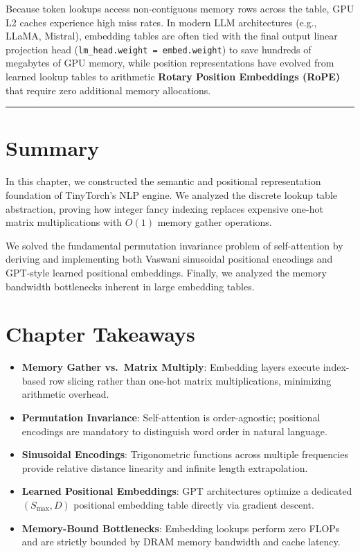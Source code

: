 \documentclass[
  letterpaper,
]{scrbook}
\providecommand{\tightlist}{%
  \setlength{\itemsep}{0pt}\setlength{\parskip}{0pt}}
\begin{document}
Because token lookups access non-contiguous memory rows across the
table, GPU L2 caches experience high miss rates. In modern LLM
architectures (e.g., LLaMA, Mistral), embedding tables are often tied
with the final output linear projection head
(\texttt{lm\_head.weight\ =\ embed.weight}) to save hundreds of
megabytes of GPU memory, while position representations have evolved
from learned lookup tables to arithmetic \textbf{Rotary Position
Embeddings (RoPE)} that require zero additional memory allocations.

\begin{center}\rule{0.5\linewidth}{0.5pt}\end{center}

\section{Summary}\label{summary-11}

In this chapter, we constructed the semantic and positional
representation foundation of TinyTorch's NLP engine. We analyzed the
discrete lookup table abstraction, proving how integer fancy indexing
replaces expensive one-hot matrix multiplications with \(O(1)\) memory
gather operations.

We solved the fundamental permutation invariance problem of
self-attention by deriving and implementing both Vaswani sinusoidal
positional encodings and GPT-style learned positional embeddings.
Finally, we analyzed the memory bandwidth bottlenecks inherent in large
embedding tables.

\section{Chapter Takeaways}\label{chapter-takeaways-11}

\begin{itemize}
\tightlist
\item
  \textbf{Memory Gather vs.~Matrix Multiply}: Embedding layers execute
  index-based row slicing rather than one-hot matrix multiplications,
  minimizing arithmetic overhead.
\item
  \textbf{Permutation Invariance}: Self-attention is order-agnostic;
  positional encodings are mandatory to distinguish word order in
  natural language.
\item
  \textbf{Sinusoidal Encodings}: Trigonometric functions across multiple
  frequencies provide relative distance linearity and infinite length
  extrapolation.
\item
  \textbf{Learned Positional Embeddings}: GPT architectures optimize a
  dedicated \((S_{\text{max}}, D)\) positional embedding table directly
  via gradient descent.
\item
  \textbf{Memory-Bound Bottlenecks}: Embedding lookups perform zero
  FLOPs and are strictly bounded by DRAM memory bandwidth and cache
  latency.
\end{itemize}
\end{document}
